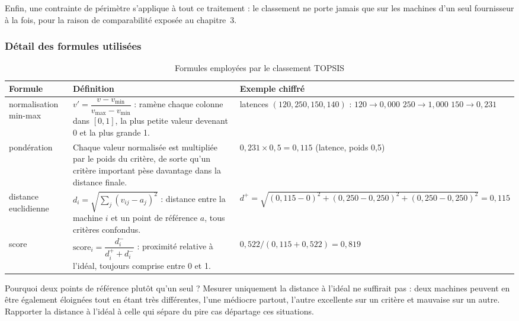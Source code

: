 Enfin, une contrainte de périmètre s'applique à tout ce traitement : le classement ne porte jamais que sur les machines d'un seul fournisseur à la fois, pour la raison de comparabilité exposée au chapitre~3.

\subsubsection{Détail des formules utilisées}

\begin{table}[H]
    \centering
    \small
    \begin{tabular}{|p{2.4cm}|p{6.1cm}|p{5cm}|}
        \hline
        \textbf{Formule} & \textbf{Définition} & \textbf{Exemple chiffré} \\
        \hline
        normalisation min-max &
        $v' = \dfrac{v - v_{\min}}{v_{\max} - v_{\min}}$ : ramène chaque colonne dans $[0,1]$, la plus petite valeur devenant 0 et la plus grande 1. &
        latences $(120, 250, 150, 140)$ : \newline $120 \rightarrow 0{,}000$ \newline $250 \rightarrow 1{,}000$ \newline $150 \rightarrow 0{,}231$ \\
        \hline
        pondération &
        Chaque valeur normalisée est multipliée par le poids du critère, de sorte qu'un critère important pèse davantage dans la distance finale. &
        $0{,}231 \times 0{,}5 = 0{,}115$ \newline (latence, poids 0,5) \\
        \hline
        distance euclidienne &
        $d_i = \sqrt{\sum_j (v_{ij} - a_j)^2}$ : distance entre la machine $i$ et un point de référence $a$, tous critères confondus. &
        $d^{+} = \sqrt{(0{,}115-0)^2 + (0{,}250-0{,}250)^2 + (0{,}250-0{,}250)^2} = 0{,}115$ \\
        \hline
        score &
        $\mathrm{score}_i = \dfrac{d_i^{-}}{d_i^{+} + d_i^{-}}$ : proximité relative à l'idéal, toujours comprise entre 0 et 1. &
        $0{,}522 / (0{,}115 + 0{,}522) = 0{,}819$ \\
        \hline
    \end{tabular}
    \caption{Formules employées par le classement TOPSIS}
    \label{tab:topsis-formules}
\end{table}

Pourquoi deux points de référence plutôt qu'un seul ? Mesurer uniquement la distance à l'idéal ne suffirait pas : deux machines peuvent en être également éloignées tout en étant très différentes, l'une médiocre partout, l'autre excellente sur un critère et mauvaise sur un autre. Rapporter la distance à l'idéal à celle qui sépare du pire cas départage ces situations.

